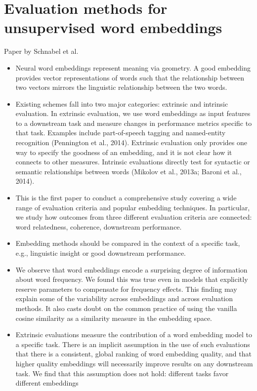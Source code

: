 \documentclass[10pt,a4paper]{article}
\begin{document}
\section{Evaluation methods for unsupervised word embeddings}
Paper by Schnabel et al. \cite{schnabel2015evaluation}
\begin{itemize}
\item{Neural word embeddings represent meaning via
geometry. A good embedding provides vector representations
of words such that the relationship between
two vectors mirrors the linguistic relationship
between the two words.}
\item{Existing schemes fall into two major categories: extrinsic and intrinsic evaluation. In extrinsic evaluation, we use word embeddings as input features to a downstream task and measure changes in performance metrics specific to that task. Examples include part-of-speech tagging and named-entity recognition (Pennington et al., 2014). Extrinsic evaluation only provides one way to specify the goodness of an embedding, and it is not clear how it connects to other measures. Intrinsic evaluations directly test for syntactic or semantic relationships between words (Mikolov et al., 2013a; Baroni et al., 2014).}
\item{This is the first
paper to conduct a comprehensive study covering a wide range of evaluation criteria and popular embedding techniques. In particular, we study how outcomes from three different evaluation criteria are connected: word relatedness, coherence, downstream performance.}
\item{Embedding methods should be compared in the context of a specific task, e.g., linguistic insight or good downstream performance.}
\item{We observe that word embeddings encode
a surprising degree of information about
word frequency. We found this was true even in models that explicitly reserve parameters to compensate for frequency effects. This finding may explain some of the variability across embeddings and across evaluation methods. It also casts doubt on the common practice of using the vanilla cosine similarity as a similarity measure in the embedding space.}
\item{Extrinsic evaluations measure the contribution of
a word embedding model to a specific task. There is an implicit assumption in the use of such evaluations that there is a consistent, global ranking of word embedding quality, and that higher quality embeddings will necessarily improve results on any downstream task. We find that this assumption does not hold: different tasks favor different embeddings}

\end{itemize}
\end{document}
